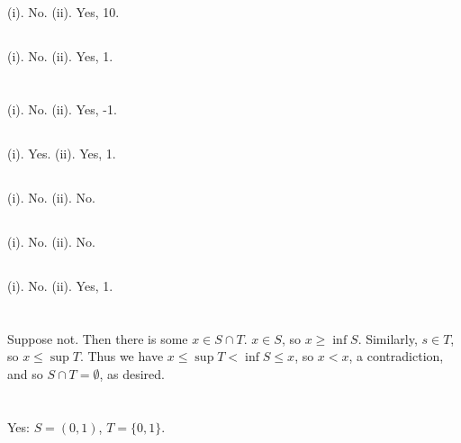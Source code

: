 \documentclass[11pt]{article}
\begin{document}
\subsection{} %
(i). No.
(ii). Yes, 10.


\subsection{} %
(i). No.
(ii). Yes, 1.


\section{} %
\subsection{} %
(i). No.
(ii). Yes, -1.


\subsection{} %
(i). Yes.
(ii). Yes, 1.


\subsection{} %
(i). No.
(ii). No.


\subsection{} %
(i). No.
(ii). No.


\subsection{} %
(i). No.
(ii). Yes, 1.


\section{} %
Suppose not.
Then there is some $x\in S\cap T$.
$x\in S$, so $x\ge\inf S$.
Similarly, $s\in T$, so $x\le\sup T$.
Thus we have $x\le\sup T<\inf S\le x$, so $x<x$, a contradiction, and so $S\cap T=\emptyset$, as desired.


\section{} %
Yes: $S=\left(0,1\right)$, $T=\{0,1\}$.
\end{document}
